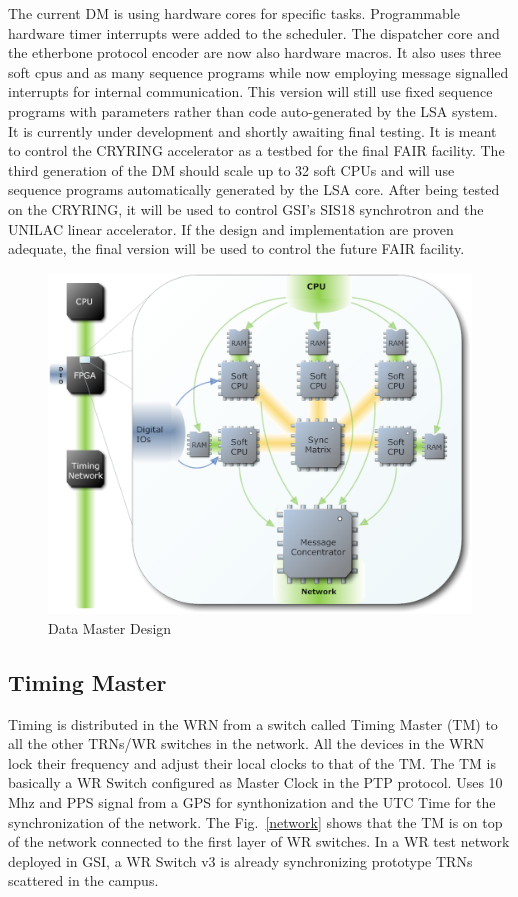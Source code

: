 The current DM is using hardware cores for specific tasks.
Programmable hardware timer interrupts were added to the scheduler.
The dispatcher core and the etherbone protocol encoder are now also hardware
macros. It also uses three soft cpus and as many sequence programs while now
employing message signalled interrupts for internal communication.
This version will still use fixed sequence programs with parameters rather
than code auto-generated by the LSA system. It is currently under development and
shortly awaiting final testing. It is meant to control the CRYRING accelerator
as a testbed for the final FAIR facility. The third generation of the DM should scale up to 32 soft CPUs and
will use sequence programs automatically generated by the LSA core. After being
tested on the CRYRING, it will be used to control GSI's SIS18 synchrotron and the UNILAC linear
accelerator. If the design and implementation are proven adequate, the final version will
be used to control the future FAIR facility.

\begin{figure}[htb]
   \centering
   \includegraphics*[scale=0.33]{fig/fatima7.eps}
   \caption{Data Master Design}
   \label{fatima}
\end{figure}


\subsection{Timing Master}
Timing is distributed in the WRN from a switch called Timing Master (TM) to all
the other TRNs/WR switches in the network. All the devices in the WRN lock their frequency 
and adjust their local clocks to that of the TM. The TM is basically a WR Switch
configured as Master Clock in the PTP protocol. Uses 10 Mhz and PPS signal from
a GPS for synthonization and the UTC Time for the synchronization of the
network. The Fig.~\ref{network} shows that the TM is on top of the network
connected to the first layer of WR switches. In a WR test network deployed in
GSI, a WR Switch v3 is already synchronizing prototype TRNs scattered in the
campus.  

